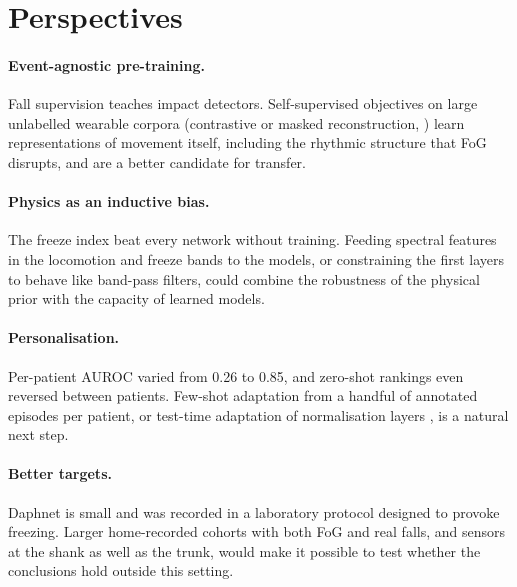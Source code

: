 \section{Perspectives}

\paragraph{Event-agnostic pre-training.} Fall supervision teaches impact detectors. Self-supervised
objectives on large unlabelled wearable corpora (contrastive or masked reconstruction,
\cite{eldele2021tstcc}) learn representations of movement itself, including the rhythmic structure that
FoG disrupts, and are a better candidate for transfer.

\paragraph{Physics as an inductive bias.} The freeze index beat every network without training. Feeding
spectral features in the locomotion and freeze bands to the models, or constraining the first layers to
behave like band-pass filters, could combine the robustness of the physical prior with the capacity of
learned models.

\paragraph{Personalisation.} Per-patient AUROC varied from 0.26 to 0.85, and zero-shot rankings even
reversed between patients. Few-shot adaptation from a handful of annotated episodes per patient, or
test-time adaptation of normalisation layers \parencite{li2017adabn}, is a natural next step.

\paragraph{Better targets.} Daphnet is small and was recorded in a laboratory protocol designed to
provoke freezing. Larger home-recorded cohorts with both FoG and real falls, and sensors at the shank as
well as the trunk, would make it possible to test whether the conclusions hold outside this setting.
